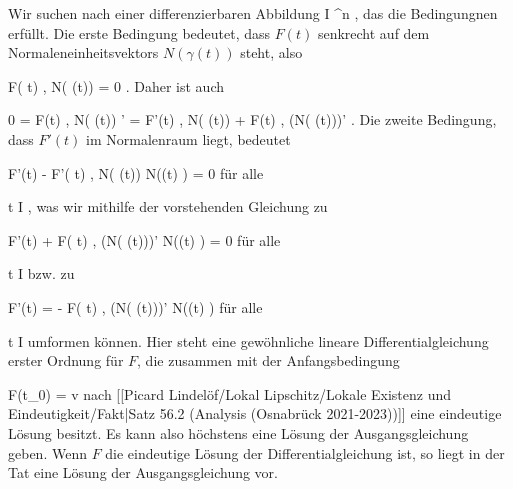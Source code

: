 {

Wir suchen nach einer differenzierbaren Abbildung
 { I } { \R^n
} {,}
das die Bedingungnen
erfüllt. Die erste Bedingung bedeutet, dass $F(t)$ senkrecht auf dem Normaleneinheitsvektors $N (\gamma(t))$ steht, also

\mavergleichskettedisp
{\vergleichskette
{ \left\langle F( t) ,  N( \gamma(t))   \right\rangle
}
{ =} { 0
}
{ } {
}
{ } {
}
{ } {
}
}
{}{}{.}
Daher ist auch

\mavergleichskettedisp
{\vergleichskette
{ 0
}
{ =} { \left\langle F(t)  ,  N( \gamma(t))   \right\rangle'
}
{ =} { \left\langle F'(t)  ,  N( \gamma(t))   \right\rangle +  \left\langle F(t)  ,  (N( \gamma(t)))'   \right\rangle
}
{ } {
}
{ } {
}
}
{}{}{.}
Die zweite Bedingung, dass $F'(t)$ im Normalenraum liegt, bedeutet

\mavergleichskettedisp
{\vergleichskette
{ F'(t) - \left\langle F'( t) ,  N( \gamma(t))   \right\rangle N(\gamma(t) )
}
{ =} { 0
}
{ } {
}
{ } {
}
{ } {
}
}
{}{}{}
für alle

\mavergleichskette
{\vergleichskette
{ t
}
{ \in }{ I
}
{  }{
}
{    }{
}
{   }{
}
}
{}{}{,}
was wir mithilfe der vorstehenden Gleichung zu

\mavergleichskettedisp
{\vergleichskette
{ F'(t) + \left\langle F( t) ,  (N( \gamma(t)))'   \right\rangle N(\gamma(t) )
}
{ =} { 0
}
{ } {
}
{ } {
}
{ } {
}
}
{}{}{}
für alle

\mavergleichskette
{\vergleichskette
{ t
}
{ \in }{ I
}
{  }{
}
{    }{
}
{   }{
}
}
{}{}{}
bzw. zu

\mavergleichskettedisp
{\vergleichskette
{ F'(t)
}
{ =} { - \left\langle F( t) ,  (N( \gamma(t)))'   \right\rangle N(\gamma(t) )
}
{ } {
}
{ } {
}
{ } {
}
}
{}{}{}
für alle

\mavergleichskette
{\vergleichskette
{ t
}
{ \in }{ I
}
{  }{
}
{    }{
}
{   }{
}
}
{}{}{}
umformen können. Hier steht eine gewöhnliche lineare Differentialgleichung erster Ordnung für $F$, die zusammen mit der Anfangsbedingung

\mavergleichskette
{\vergleichskette
{ F(t_0)
}
{ = }{ v
}
{  }{
}
{    }{
}
{   }{
}
}
{}{}{}
nach
[[Picard Lindelöf/Lokal Lipschitz/Lokale Existenz und Eindeutigkeit/Fakt|Satz 56.2 (Analysis (Osnabrück 2021-2023))]]
eine eindeutige Lösung besitzt. Es kann also höchstens eine Lösung der Ausgangsgleichung geben. Wenn $F$ die eindeutige Lösung der Differentialgleichung ist, so liegt in der Tat eine Lösung der Ausgangsgleichung vor.

}

